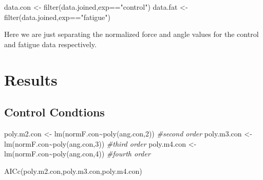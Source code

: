 \documentclass[
]{article}
\newenvironment{Shaded}{\begin{snugshade}}{\end{snugshade}}
\newcommand{\CommentTok}[1]{\textcolor[rgb]{0.56,0.35,0.01}{\textit{#1}}}
\newcommand{\DecValTok}[1]{\textcolor[rgb]{0.00,0.00,0.81}{#1}}
\newcommand{\FunctionTok}[1]{\textcolor[rgb]{0.00,0.00,0.00}{#1}}
\newcommand{\NormalTok}[1]{#1}
\newcommand{\OtherTok}[1]{\textcolor[rgb]{0.56,0.35,0.01}{#1}}
\newcommand{\SpecialCharTok}[1]{\textcolor[rgb]{0.00,0.00,0.00}{#1}}
\newcommand{\StringTok}[1]{\textcolor[rgb]{0.31,0.60,0.02}{#1}}
\begin{document}
\begin{Shaded}
\begin{Highlighting}[]
\NormalTok{data.con }\OtherTok{\textless{}{-}} \FunctionTok{filter}\NormalTok{(data.joined,exp}\SpecialCharTok{==}\StringTok{"control"}\NormalTok{)}
\NormalTok{data.fat }\OtherTok{\textless{}{-}} \FunctionTok{filter}\NormalTok{(data.joined,exp}\SpecialCharTok{==}\StringTok{"fatigue"}\NormalTok{)}
\end{Highlighting}
\end{Shaded}

Here we are just separating the normalized force and angle values for
the control and fatigue data respectively.

\begin{Shaded}
\end{Shaded}

\hypertarget{results}{%
\section{Results}\label{results}}

\hypertarget{control-condtions}{%
\subsection{Control Condtions}\label{control-condtions}}

\begin{Shaded}
\begin{Highlighting}[]
\NormalTok{poly.m2.con }\OtherTok{\textless{}{-}} \FunctionTok{lm}\NormalTok{(normF.con}\SpecialCharTok{\textasciitilde{}}\FunctionTok{poly}\NormalTok{(ang.con,}\DecValTok{2}\NormalTok{)) }\CommentTok{\#second order}
\NormalTok{poly.m3.con }\OtherTok{\textless{}{-}} \FunctionTok{lm}\NormalTok{(normF.con}\SpecialCharTok{\textasciitilde{}}\FunctionTok{poly}\NormalTok{(ang.con,}\DecValTok{3}\NormalTok{)) }\CommentTok{\#third order}
\NormalTok{poly.m4.con }\OtherTok{\textless{}{-}} \FunctionTok{lm}\NormalTok{(normF.con}\SpecialCharTok{\textasciitilde{}}\FunctionTok{poly}\NormalTok{(ang.con,}\DecValTok{4}\NormalTok{)) }\CommentTok{\#fourth order}

\FunctionTok{AICc}\NormalTok{(poly.m2.con,poly.m3.con,poly.m4.con)}
\end{Highlighting}
\end{Shaded}
\end{document}
